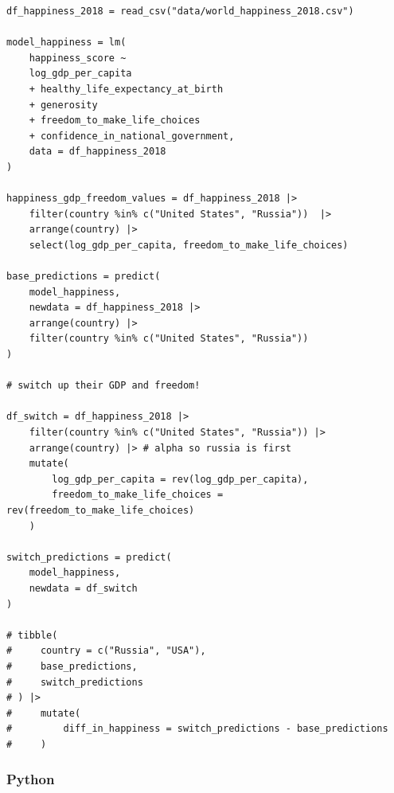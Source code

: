 \documentclass[
  letterpaper,
]{krantz}
\begin{document}
\begin{verbatim}
df_happiness_2018 = read_csv("data/world_happiness_2018.csv")

model_happiness = lm(
    happiness_score ~ 
    log_gdp_per_capita 
    + healthy_life_expectancy_at_birth
    + generosity 
    + freedom_to_make_life_choices
    + confidence_in_national_government, 
    data = df_happiness_2018
)

happiness_gdp_freedom_values = df_happiness_2018 |> 
    filter(country %in% c("United States", "Russia"))  |> 
    arrange(country) |> 
    select(log_gdp_per_capita, freedom_to_make_life_choices)

base_predictions = predict(
    model_happiness, 
    newdata = df_happiness_2018 |> 
    arrange(country) |>
    filter(country %in% c("United States", "Russia")) 
)

# switch up their GDP and freedom!

df_switch = df_happiness_2018 |> 
    filter(country %in% c("United States", "Russia")) |> 
    arrange(country) |> # alpha so russia is first
    mutate(
        log_gdp_per_capita = rev(log_gdp_per_capita),
        freedom_to_make_life_choices = rev(freedom_to_make_life_choices)
    )

switch_predictions = predict(
    model_happiness, 
    newdata = df_switch
)

# tibble(
#     country = c("Russia", "USA"),
#     base_predictions,
#     switch_predictions
# ) |> 
#     mutate(
#         diff_in_happiness = switch_predictions - base_predictions
#     )
\end{verbatim}

\subsubsection{Python}
\end{document}
